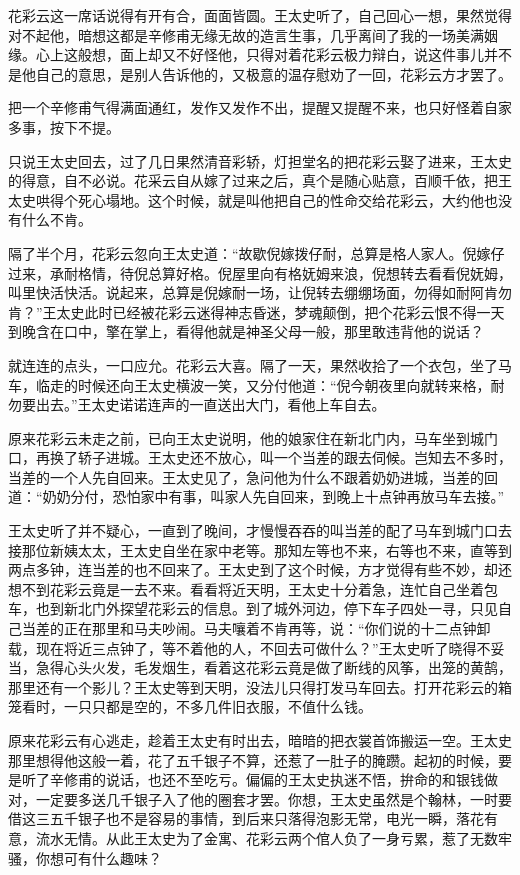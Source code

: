\documentclass[12pt,UTF8]{ctexbook}
\begin{document}
{{{花彩云这一席话说得有开有合，面面皆圆。王太史听了，自己回心一想，果然觉得对不起他，暗想这都是辛修甫无缘无故的造言生事，几乎离间了我的一场美满姻缘。心上这般想，面上却又不好怪他，只得对着花彩云极力辩白，说这件事儿并不是他自己的意思，是别人告诉他的，又极意的温存慰劝了一回，花彩云方才罢了。

把一个辛修甫气得满面通红，发作又发作不出，提醒又提醒不来，也只好怪着自家多事，按下不提。

只说王太史回去，过了几日果然清音彩轿，灯担堂名的把花彩云娶了进来，王太史的得意，自不必说。花采云自从嫁了过来之后，真个是随心贴意，百顺千依，把王太史哄得个死心塌地。这个时候，就是叫他把自己的性命交给花彩云，大约他也没有什么不肯。

隔了半个月，花彩云忽向王太史道：“故歇倪嫁拨仔耐，总算是格人家人。倪嫁仔过来，承耐格情，待倪总算好格。倪屋里向有格妩姆来浪，倪想转去看看倪妩姆，叫里快活快活。说起来，总算是倪嫁耐一场，让倪转去绷绷场面，勿得如耐阿肯勿肯？”王太史此时已经被花彩云迷得神志昏迷，梦魂颠倒，把个花彩云恨不得一天到晚含在口中，擎在掌上，看得他就是神圣父母一般，那里敢违背他的说话？

就连连的点头，一口应允。花彩云大喜。隔了一天，果然收拾了一个衣包，坐了马车，临走的时候还向王太史横波一笑，又分付他道：“倪今朝夜里向就转来格，耐勿要出去。”王太史诺诺连声的一直送出大门，看他上车自去。

原来花彩云未走之前，已向王太史说明，他的娘家住在新北门内，马车坐到城门口，再换了轿子进城。王太史还不放心，叫一个当差的跟去伺候。岂知去不多时，当差的一个人先自回来。王太史见了，急问他为什么不跟着奶奶进城，当差的回道：“奶奶分付，恐怕家中有事，叫家人先自回来，到晚上十点钟再放马车去接。”

王太史听了并不疑心，一直到了晚间，才慢慢吞吞的叫当差的配了马车到城门口去接那位新姨太太，王太史自坐在家中老等。那知左等也不来，右等也不来，直等到两点多钟，连当差的也不回来了。王太史到了这个时候，方才觉得有些不妙，却还想不到花彩云竟是一去不来。看看将近天明，王太史十分着急，连忙自己坐着包车，也到新北门外探望花彩云的信息。到了城外河边，停下车子四处一寻，只见自己当差的正在那里和马夫吵闹。马夫嚷着不肯再等，说：“你们说的十二点钟卸载，现在将近三点钟了，等不着他的人，不回去可做什么？”王太史听了晓得不妥当，急得心头火发，毛发烟生，看着这花彩云竟是做了断线的风筝，出笼的黄鹄，那里还有一个影儿？王太史等到天明，没法儿只得打发马车回去。打开花彩云的箱笼看时，一只只都是空的，不多几件旧衣服，不值什么钱。

原来花彩云有心逃走，趁着王太史有时出去，暗暗的把衣裳首饰搬运一空。王太史那里想得他这般一着，花了五千银子不算，还惹了一肚子的腌躜。起初的时候，要是听了辛修甫的说话，也还不至吃亏。偏偏的王太史执迷不悟，拚命的和银钱做对，一定要多送几千银子入了他的圈套才罢。你想，王太史虽然是个翰林，一时要借这三五千银子也不是容易的事情，到后来只落得泡影无常，电光一瞬，落花有意，流水无情。从此王太史为了金寓、花彩云两个倌人负了一身亏累，惹了无数牢骚，你想可有什么趣味？

}}}
\end{document}
